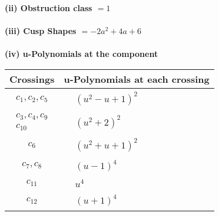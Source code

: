 \documentclass[1p]{elsarticle_modified}
\theoremstyle{definition}
\begin{document}
\flushleft \textbf{(ii) Obstruction class $= 1$}\\~\\
\flushleft \textbf{(iii) Cusp Shapes $= -2 a^2+4 a+6$}\\~\\
\newpage\renewcommand{\arraystretch}{1}
\flushleft \textbf{(iv) u-Polynomials at the component}\newline \\
\begin{tabular}{m{50pt}|m{274pt}}
Crossings & \hspace{64pt}u-Polynomials at each crossing \\
\hline $$\begin{aligned}c_{1},c_{2},c_{5}\end{aligned}$$&$\begin{aligned}
&(u^2- u+1)^2
\end{aligned}$\\
\hline $$\begin{aligned}c_{3},c_{4},c_{9}\\c_{10}\end{aligned}$$&$\begin{aligned}
&(u^2+2)^2
\end{aligned}$\\
\hline $$\begin{aligned}c_{6}\end{aligned}$$&$\begin{aligned}
&(u^2+u+1)^2
\end{aligned}$\\
\hline $$\begin{aligned}c_{7},c_{8}\end{aligned}$$&$\begin{aligned}
&(u-1)^4
\end{aligned}$\\
\hline $$\begin{aligned}c_{11}\end{aligned}$$&$\begin{aligned}
&u^4
\end{aligned}$\\
\hline $$\begin{aligned}c_{12}\end{aligned}$$&$\begin{aligned}
&(u+1)^4
\end{aligned}$\\
\hline
\end{tabular}\\~\\
\end{document}

